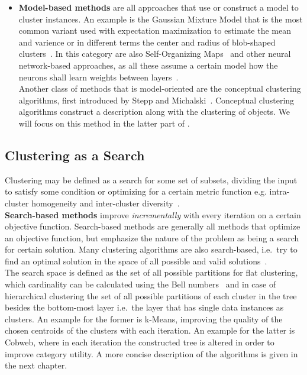 \begin{itemize}
    \item \textbf{Model-based methods} are all approaches that use or construct a model to cluster instances. An example is the Gaussian Mixture Model that is the most common variant used with expectation maximization to estimate the mean and varience or in different terms the center and radius of blob-shaped clusters~\cite{han2011data}. In this category are also Self-Organizing Maps~\cite{kohonen1990self} and other neural network-based approaches, as all these assume a certain model how the neurons shall learn weights between layers~\cite{kohonen1997exploration}.  \\
    Another class of methods that is model-oriented are the conceptual clustering algorithms, first introduced by Stepp and Michalski~\cite{michalski1983learning}. Conceptual clustering algorithms construct a description along with the clustering of objects. We will focus on this method in the latter part of .
\end{itemize}


\subsection{Clustering as a Search}\label{\positionnumber}
Clustering may be defined as a search for some set of subsets, dividing the input to satisfy some condition or optimizing for a certain metric function e.g. intra-cluster homogeneity and inter-cluster diversity~\cite{Fisher1987}. \\
\textbf{Search-based methods} improve \textit{incrementally} with every iteration on a certain objective function. Search-based methods are generally all methods that optimize an objective function, but emphasize the nature of the problem as being a search for certain solution. Many clustering algorithms are also search-based, i.e.~try to find an optimal solution in the space of all possible and valid solutions~\cite{overview_clust}. \\
The search space is defined as the set of all possible partitions for flat clustering, which cardinality can be calculated using the Bell numbers~\cite{10.2307/2300300} and in case of hierarchical clustering the set of all possible partitions of each cluster in the tree besides the bottom-most layer i.e.~the layer that has single data instances as clusters. An example for the former is k-Means, improving the quality of the chosen centroids of the clusters with each iteration. An example for the latter is Cobweb, where in each iteration the constructed tree is altered in order to improve category utility. A more concise description of the algorithms is given in the next chapter.

